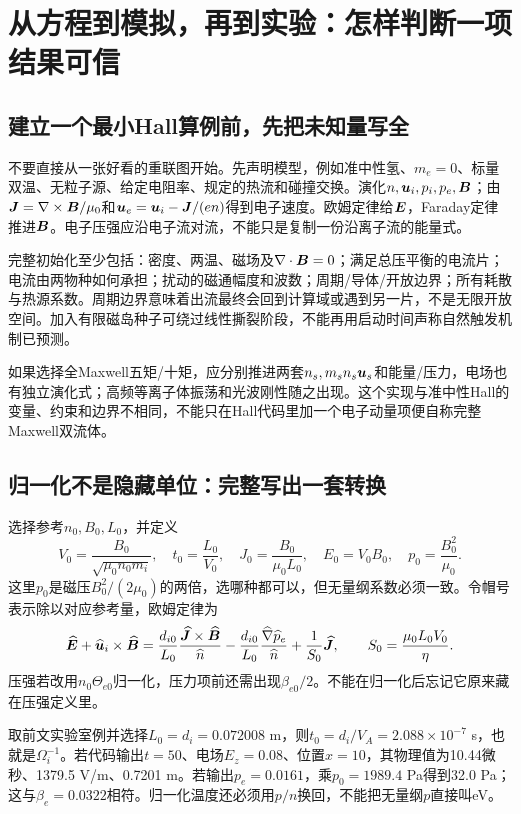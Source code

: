 \chapter{从方程到模拟，再到实验：怎样判断一项结果可信}
\label{hall:practice}
\section{建立一个最小Hall算例前，先把未知量写全}
不要直接从一张好看的重联图开始。先声明模型，例如准中性氢、$m_e=0$、标量双温、无粒子源、给定电阻率、规定的热流和碰撞交换。演化$n,\bm{u}_i,p_i,p_e,\bm{B}$；由$\bm{J}=\nabla\times\bm{B}/\mu_0$和$\bm{u}_e=\bm{u}_i-\bm{J}/(en)$得到电子速度。欧姆定律给$\bm{E}$，Faraday定律推进$\bm{B}$。电子压强应沿电子流对流，不能只是复制一份沿离子流的能量式。

完整初始化至少包括：密度、两温、磁场及$\nabla\cdot\bm{B}=0$；满足总压平衡的电流片；电流由两物种如何承担；扰动的磁通幅度和波数；周期/导体/开放边界；所有耗散与热源系数。周期边界意味着出流最终会回到计算域或遇到另一片，不是无限开放空间。加入有限磁岛种子可绕过线性撕裂阶段，不能再用启动时间声称自然触发机制已预测。

如果选择全Maxwell五矩/十矩，应分别推进两套$n_s,m_sn_s\bm{u}_s$和能量/压力，电场也有独立演化式；高频等离子体振荡和光波刚性随之出现。这个实现与准中性Hall的变量、约束和边界不相同，不能只在Hall代码里加一个电子动量项便自称完整Maxwell双流体。

\section{归一化不是隐藏单位：完整写出一套转换}
选择参考$n_0,B_0,L_0$，并定义
\begin{equation}
V_0=\frac{B_0}{\sqrt{\mu_0n_0m_i}},\quad
 t_0=\frac{L_0}{V_0},\quad J_0=\frac{B_0}{\mu_0L_0},\quad
E_0=V_0B_0,\quad p_0=\frac{B_0^2}{\mu_0}.
\end{equation}
这里$p_0$是磁压$B_0^2/(2\mu_0)$的两倍，选哪种都可以，但无量纲系数必须一致。令帽号表示除以对应参考量，欧姆定律为
\begin{equation}
\widehat{\bm{E}}+\widehat{\bm{u}}_i\times\widehat{\bm{B}}
=\frac{d_{i0}}{L_0}\frac{\widehat{\bm{J}}\times\widehat{\bm{B}}}{\widehat n}
-\frac{d_{i0}}{L_0}\frac{\widehat\nabla\widehat p_e}{\widehat n}
+\frac{1}{S_0}\widehat{\bm{J}},
\qquad S_0=\frac{\mu_0L_0V_0}{\eta}.
\end{equation}
压强若改用$n_0\Theta_{e0}$归一化，压力项前还需出现$\beta_{e0}/2$。不能在归一化后忘记它原来藏在压强定义里。

取前文实验室例并选择$L_0=d_i=0.072008$ m，则$t_0=d_i/V_A=2.088\times10^{-7}$ s，也就是$\Omega_i^{-1}$。若代码输出$t=50$、电场$E_z=0.08$、位置$x=10$，其物理值为10.44微秒、1379.5 V/m、0.7201 m。若输出$p_e=0.0161$，乘$p_0=1989.4$ Pa得到32.0 Pa；这与$\beta_e=0.0322$相符。归一化温度还必须用$p/n$换回，不能把无量纲$p$直接叫eV。


